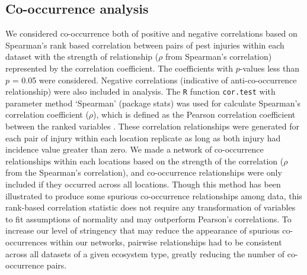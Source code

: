 \subsection*{Co-occurrence analysis}

We considered co-occurrence both of positive and negative correlations based on Spearman's rank based correlation between pairs of pest injuries within each dataset with the strength of relationship ($\rho$ from Spearman's correlation) represented by the correlation coefficient. The coefficients with $p$-values less than $p$ = 0.05 were considered. Negative correlations (indicative of anti-co-occurrence relationship) were also included in analysis. The \texttt{R} function \texttt{cor.test} with parameter method `Spearman' (package stats) was used for calculate Spearman's correlation coefficient ($\rho$), which is defined as the Pearson correlation coefficient between the ranked variables \cite{R_2015}.
These correlation relationships were generated for each pair of injury within each location replicate as long as both injury had incidence value greater than zero. We made a network of co-occurrence relationships within each locations based on the strength of the correlation ($\rho$ from the Spearman's correlation), and co-occurrence relationships were only included if they occurred across all locations. Though this method has been illustrated to produce some spurious co-occurrence relationships among data, this rank-based correlation statistic does not require any transformation of variables to fit assumptions of normality and may outperform Pearson’s correlations. To increase our level of stringency that may reduce the appearance of spurious co-occurrences within our networks, pairwise relationships had to be consistent across all datasets of a given ecosystem type, greatly reducing the number of co-occurrence pairs.
